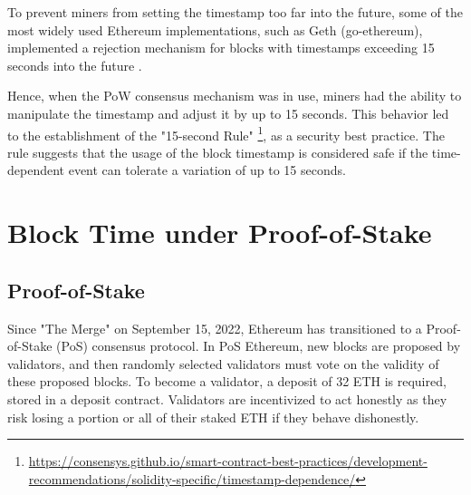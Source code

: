 %

To prevent miners from setting the timestamp too far into the future, some of the most widely used Ethereum implementations, such as Geth (go-ethereum), implemented a rejection mechanism for blocks with timestamps exceeding 15 seconds into the future \cite{go-ethereum-15-sek-limit}.

Hence, when the PoW consensus mechanism was in use, miners had the ability to
manipulate the timestamp and adjust it by up to 15 seconds. This behavior led
to the establishment of the "15-second Rule"
\footnote{\url{https://consensys.github.io/smart-contract-best-practices/development-recommendations/solidity-specific/timestamp-dependence/}},
as a security best practice. The
rule suggests that the usage of the block timestamp is considered
safe if the time-dependent event can tolerate a variation of up to 15 seconds. 




%

\section{Block Time under Proof-of-Stake}

\subsection{Proof-of-Stake}

Since "The Merge" on September 15, 2022, Ethereum has transitioned to a
Proof-of-Stake (PoS) consensus protocol. In PoS Ethereum, new blocks are
proposed by validators, and then randomly selected validators must vote on the
validity of these proposed blocks. To become a validator, a deposit of 32 ETH
is required, stored in a deposit contract. Validators are incentivized to act
honestly as they risk losing a portion or all of their staked ETH if they
behave dishonestly.


